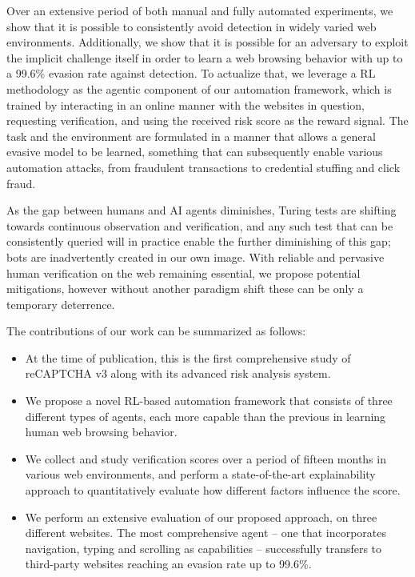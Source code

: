 Over an extensive period of both manual and fully automated experiments, we show that it is possible to consistently avoid detection in widely varied web environments.
Additionally, we show that it is possible for an adversary to exploit the implicit challenge itself in order to learn a web browsing behavior with up to a 99.6\% evasion rate against detection.
To actualize that, we leverage a \gls{RL} methodology as the agentic component of our automation framework, which is trained by interacting in an online manner with the websites in question, requesting verification, and using the received risk score as the reward signal.
The task and the environment are formulated in a manner that allows a general evasive model to be learned, something that can subsequently enable various automation attacks, from fraudulent transactions to credential stuffing and click fraud.

As the gap between humans and AI agents diminishes, Turing tests are shifting towards continuous observation and verification, and any such test that can be consistently queried will in practice enable the further diminishing of this gap; bots are inadvertently created in our own image.
With reliable and pervasive human verification on the web remaining essential, we propose potential mitigations, however without another paradigm shift these can be only a temporary deterrence.

The contributions of our work can be summarized as follows:
\begin{itemize}
\item At the time of publication, this is the first comprehensive study of reCAPTCHA v3 along with its advanced risk analysis system.
\item We propose a novel RL-based automation framework that consists of three different types of agents, each more capable than the previous in learning human web browsing behavior.
\item We collect and study verification scores over a period of fifteen months in various web environments, and perform a state-of-the-art explainability approach to quantitatively evaluate how different factors influence the score.
\item We perform an extensive evaluation of our proposed approach, on three different websites.
The most comprehensive agent -- one that incorporates navigation, typing and scrolling as capabilities -- successfully transfers to third-party websites reaching an evasion rate up to 99.6\%.
\end{itemize}

